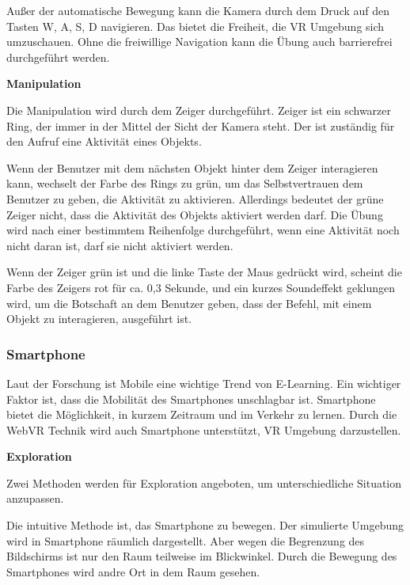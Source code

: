  Außer der automatische Bewegung kann die Kamera durch dem Druck auf den Tasten W, A, S, D navigieren. Das bietet die Freiheit, die VR Umgebung sich umzuschauen. Ohne die freiwillige Navigation kann die Übung auch barrierefrei durchgeführt werden.
  
  \textbf{Manipulation}
  
  Die Manipulation wird durch dem Zeiger durchgeführt. Zeiger ist ein schwarzer Ring, der immer in der Mittel der Sicht der Kamera steht. Der ist zuständig für den Aufruf eine Aktivität eines Objekts.
  
  Wenn der Benutzer mit dem nächsten Objekt hinter dem Zeiger interagieren kann, wechselt der Farbe des Rings zu grün, um das Selbstvertrauen dem Benutzer zu geben, die Aktivität zu aktivieren. Allerdings bedeutet der grüne Zeiger nicht, dass die Aktivität des Objekts aktiviert werden darf. Die Übung wird nach einer bestimmtem Reihenfolge durchgeführt, wenn eine Aktivität noch nicht daran ist, darf sie nicht aktiviert werden.
  
  Wenn der Zeiger grün ist und die linke Taste der Maus gedrückt wird, scheint die Farbe des Zeigers rot für ca. 0,3 Sekunde, und ein kurzes Soundeffekt geklungen wird, um die Botschaft an dem Benutzer geben, dass der Befehl, mit einem Objekt zu interagieren, ausgeführt ist. 
  
 \subsubsection{Smartphone}
 Laut der Forschung ist Mobile eine wichtige Trend von E-Learning. Ein wichtiger Faktor ist, dass die Mobilität des Smartphones unschlagbar ist. Smartphone bietet die Möglichkeit, in kurzem Zeitraum und im Verkehr zu lernen. Durch die WebVR Technik wird auch Smartphone unterstützt, VR Umgebung darzustellen.
 
  \textbf{Exploration}
  
  Zwei Methoden werden für Exploration angeboten, um unterschiedliche Situation anzupassen.
  
  Die intuitive Methode ist, das Smartphone zu bewegen. Der simulierte Umgebung wird in Smartphone räumlich dargestellt. Aber wegen die Begrenzung des Bildschirms ist nur den Raum teilweise im Blickwinkel. Durch die Bewegung des Smartphones wird andre Ort in dem Raum gesehen.

